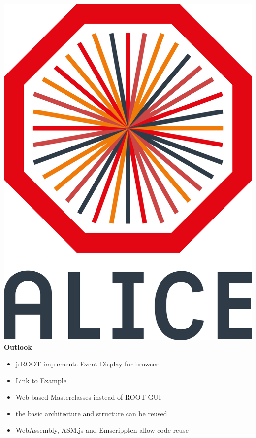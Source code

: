 \documentclass[aspectratio=169,14pt,dvipsnames]{beamer}
\begin{document}
\begin{frame}{\includegraphics[height=0.07\textheight]{2012-Jul-04-4_Color_Logo_CB.png} \hspace{0.2cm}\textbf{Outlook}}
  \begin{itemize}
    \item jsROOT implements Event-Display for browser
    \item \href{https://root.cern.ch/js/latest/?nobrowser\&json=../files/geom/simple_alice.json.gz\&file=../files/geom/tracks_hits.root\&item=simple_alice.json.gz+tracks_hits.root/tracks;1+tracks_hits.root/hits;1}{Link to Example}
    \item Web-based Masterclasses instead of ROOT-GUI
    \item the basic architecture and structure can be reused
    \item WebAssembly, ASM.js and Emscrippten allow code-reuse
  \end{itemize}
\end{frame}
\end{document}
